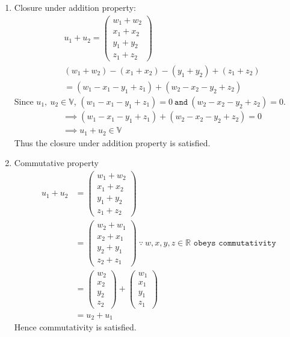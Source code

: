 \documentclass[12pt,letterpaper,fleqn]{article}
\theoremstyle{definition}
\begin{document}
\begin{enumerate}
\item Closure under addition property:
\begin{equation*}
\begin{split}
&u_1 + u_2 = 
\begin{pmatrix}
w_1 + w_2\\
x_1 + x_2\\
y_1 + y_2\\
z_1 + z_2
\end{pmatrix}\\
&(w_1 + w_2) -(x_1 + x_2) - (y_1 + y_2) + (z_1 + z_2)\\
&= (w_1 - x_1 - y_1 + z_1) + (w_2 - x_2 - y_2 + z_2)
\end{split}
\end{equation*}
Since $u_1,~u_2 \in \mathbb{V}$, $(w_1 - x_1 - y_1 + z_1) = 0 ~\texttt{and}~(w_2 - x_2 - y_2 + z_2) = 0$.
\begin{equation*}
\begin{split}
&\implies (w_1 - x_1 - y_1 + z_1) + (w_2 - x_2 - y_2 + z_2) = 0\\
&\implies u_1 + u_2 \in \mathbb{V}
\end{split}
\end{equation*}
Thus the closure under addition property is satisfied.\\

\item Commutative property
\begin{equation*}
\begin{split}
u_1 + u_2 &= 
\begin{pmatrix}
w_1 + w_2\\
x_1 + x_2\\
y_1 + y_2\\
z_1 + z_2
\end{pmatrix}\\
&= \begin{pmatrix}
w_2 + w_1\\
x_2 + x_1\\
y_2 + y_1\\
z_2 + z_1
\end{pmatrix} ~\because~ w,x,y,z \in \mathbb{R} \texttt{ obeys commutativity}\\
&= \begin{pmatrix}
w_2\\
x_2\\
y_2\\
z_2 
\end{pmatrix} + 
\begin{pmatrix}
w_1\\
x_1\\
y_1\\
z_1 
\end{pmatrix}\\
&= u_2 + u_1
\end{split}
\end{equation*}
Hence commutativity is satisfied.


\end{enumerate}
\end{document}
